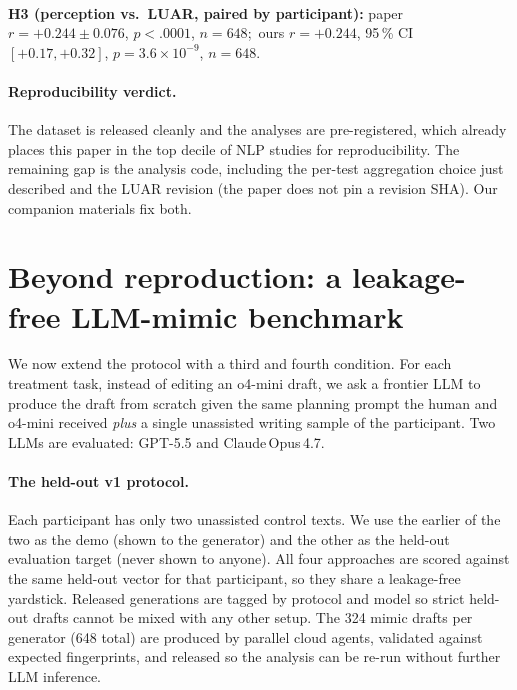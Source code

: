 \documentclass[runningheads]{llncs}
\begin{document}
\begin{table}[t]
\centering
\caption{Reproduction of the seven preregistered hypotheses
(H1a\,\dots\,H2c) and the H3 perception-vs-LUAR correlation.
\textsc{Paper $g$} is the value printed in
Baumler et~al.~\cite{baumler2026personalstyle}; \textsc{Ours $g$} is
the value our re-implementation produces from the released logs.
$\checkmark$ in BH-FDR means the test survives Benjamini--Hochberg
correction at $q{=}0.05$ over the seven preregistered tests. The H3
row reports the rmcorr~\cite{bakdash2017rmcorr} correlation rather
than $g$.}
\label{tab:repro}
\\[3pt]
{\small \textbf{H3 (perception vs.\ LUAR, paired by participant):}
paper $r{=}+0.244\pm0.076$, $p<.0001$, $n{=}648$;\,
ours $r{=}+0.244$, 95\,\% CI $[+0.17,+0.32]$, $p{=}3.6{\times}10^{-9}$,
$n{=}648$.}
\end{table}

\paragraph{Reproducibility verdict.} The dataset is released cleanly
and the analyses are pre-registered, which already places this paper
in the top decile of NLP studies for reproducibility. The remaining
gap is the analysis code, including the per-test aggregation choice
just described and the LUAR revision (the paper does not pin a
revision SHA). Our companion materials fix both.

\section{Beyond reproduction: a leakage-free LLM-mimic
benchmark}\label{sec:extension}

We now extend the protocol with a third and fourth condition. For
each treatment task, instead of editing an o4-mini draft, we ask a
frontier LLM to produce the draft from scratch given the same
planning prompt the human and o4-mini received \emph{plus} a single
unassisted writing sample of the participant. Two LLMs are evaluated:
GPT-5.5 and Claude\,Opus\,4.7.

\paragraph{The held-out v1 protocol.}
Each participant has only two unassisted control texts. We use the
earlier of the two as the demo (shown to the generator) and the
other as the held-out evaluation target (never
shown to anyone). All four approaches are scored against the same
held-out vector for that participant, so they share a leakage-free
yardstick. Released generations are tagged by protocol and model so
strict held-out drafts cannot be mixed with any other setup. The 324
mimic drafts per generator (648 total) are produced by parallel
cloud agents, validated against expected fingerprints, and released
so the analysis can be re-run without further LLM inference.
\end{document}
